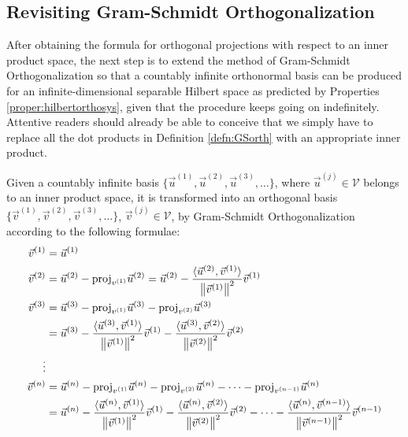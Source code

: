 \subsection{Revisiting Gram-Schmidt Orthogonalization}
\label{section:GSorthinnersec}

After obtaining the formula for orthogonal projections with respect to an inner product space, the next step is to extend the method of Gram-Schmidt Orthogonalization so that a countably infinite orthonormal basis can be produced for an infinite-dimensional separable Hilbert space as predicted by Properties \ref{proper:hilbertorthosys}, given that the procedure keeps going on indefinitely. Attentive readers should already be able to conceive that we simply have to replace all the dot products in Definition \ref{defn:GSorth} with an appropriate inner product. 
\begin{defn}
\label{defn:GSorthinner}
Given a countably infinite basis $\{\vec{u}^{(1)}, \vec{u}^{(2)}, \vec{u}^{(3)}, \ldots\}$, where $\vec{u}^{(j)} \in \mathcal{V}$ belongs to an inner product space, it is transformed into an orthogonal basis $\{\vec{v}^{(1)}, \vec{v}^{(2)}, \vec{v}^{(3)}, \ldots\}$, $\vec{v}^{(j)} \in \mathcal{V}$, by Gram-Schmidt Orthogonalization according to the following formulae:
\begin{align}
\vec{v}^{(1)} &= \vec{u}^{(1)} \nonumber\\
\vec{v}^{(2)} &= \vec{u}^{(2)} - \text{proj}_{v^{(1)}}\vec{u}^{(2)} = \vec{u}^{(2)} - \frac{\langle \vec{u}^{(2)}, \vec{v}^{(1)}\rangle}{\norm{\vec{v}^{(1)}}^2} \vec{v}^{(1)} \nonumber \\
\vec{v}^{(3)} &= \vec{u}^{(3)} - \text{proj}_{v^{(1)}}\vec{u}^{(3)} - \text{proj}_{v^{(2)}}\vec{u}^{(3)} \nonumber\\
&= \vec{u}^{(3)} - \frac{\langle\vec{u}^{(3)}, \vec{v}^{(1)}\rangle}{\norm{\vec{v}^{(1)}}^2} \vec{v}^{(1)} - \frac{\langle\vec{u}^{(3)}, \vec{v}^{(2)}\rangle}{\norm{\vec{v}^{(2)}}^2} \vec{v}^{(2)} \\
\vdots \nonumber \\
\vec{v}^{(n)} &= \vec{u}^{(n)} - \text{proj}_{v^{(1)}}\vec{u}^{(n)} - \text{proj}_{v^{(2)}}\vec{u}^{(n)} - \cdots - \text{proj}_{v^{(n-1)}}\vec{u}^{(n)} \nonumber \\
&= \vec{u}^{(n)} - \frac{\langle\vec{u}^{(n)}, \vec{v}^{(1)}\rangle}{\norm{\vec{v}^{(1)}}^2} \vec{v}^{(1)} - \frac{\langle\vec{u}^{(n)}, \vec{v}^{(2)}\rangle}{\norm{\vec{v}^{(2)}}^2} \vec{v}^{(2)} - \cdots - \frac{\langle\vec{u}^{(n)}, \vec{v}^{(n-1)}\rangle}{\norm{\vec{v}^{(n-1)}}^2} \vec{v}^{(n-1)} \nonumber

\end{align}
\end{defn}
